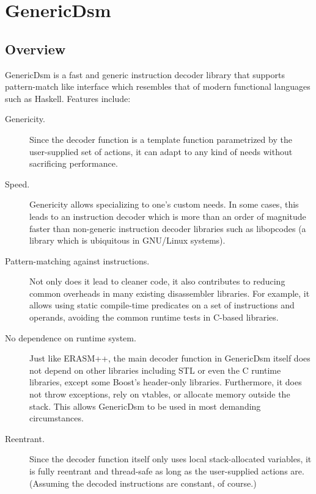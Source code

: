 \documentclass{article}
\begin{document}
\section{GenericDsm}
\label{sec:gener-dsm}

\subsection{Overview}
\label{sec:overview-1}

GenericDsm is a fast and generic instruction decoder library
that supports pattern-match like interface which resembles that of
modern functional languages such as Haskell. Features include:
\begin{description}
\item [Genericity.] Since the decoder function is a template function
  parametrized by the user-supplied set of actions, it can adapt to
  any kind of needs without sacrificing performance.

\item[Speed.] Genericity allows specializing to one's custom needs. In
  some cases, this leads to an instruction decoder which is more than 
  an order  of magnitude faster than non-generic instruction decoder
  libraries such as libopcodes (a library which is ubiquitous in
  GNU/Linux systems).

\item[Pattern-matching against instructions.] Not only does it lead to
  cleaner code, it also contributes to reducing common overheads in
  many existing disassembler libraries. For example, it allows using
  static compile-time predicates on a set of instructions and
  operands, avoiding the common runtime tests in C-based libraries.

\item[No dependence on runtime system.] Just like ERASM++, the main
  decoder function in GenericDsm itself does not depend on other
  libraries including STL or even the C runtime libraries, except some
  Boost's header-only libraries. Furthermore, it does not throw
  exceptions, rely on vtables, or allocate memory outside the
  stack. This allows GenericDsm to be used in most demanding
  circumstances.

\item [Reentrant.] Since the decoder function itself only uses local
  stack-allocated variables, it is fully reentrant and thread-safe as
  long as the user-supplied actions are. (Assuming the decoded
  instructions are constant, of course.)

\end{description}
\end{document}
